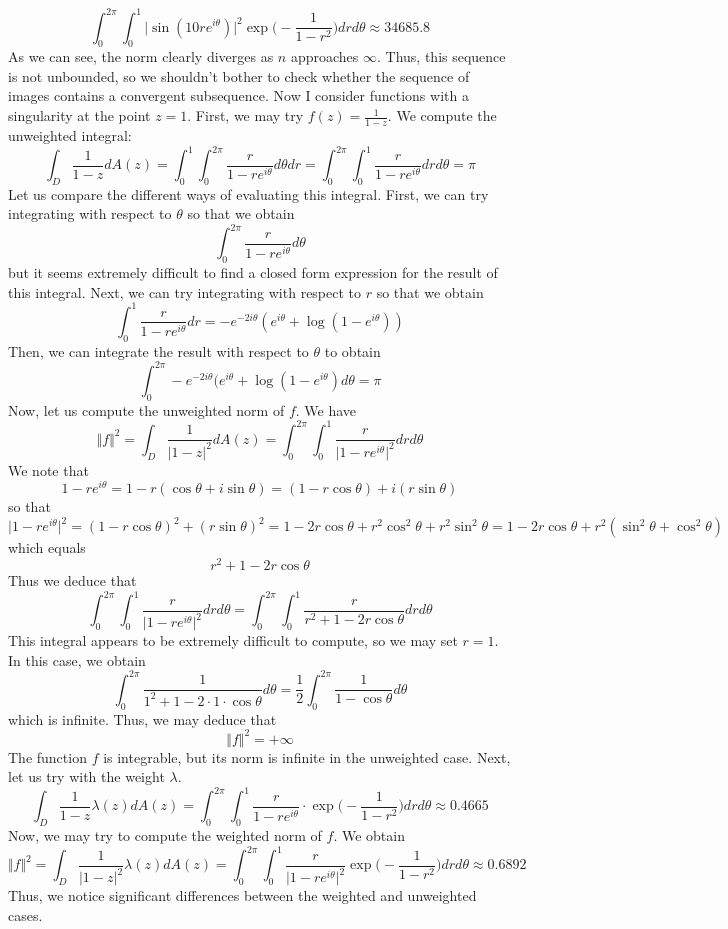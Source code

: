 \documentclass[12pt]{article}
\begin{document}
\[
\int_0^{2\pi} \int_0^1 \vert \sin(10re^{i\theta}) \vert^2 \exp\bigg(-\frac{1}{1-r^2}\bigg) dr d\theta \approx 34685.8
\] As we can see, the norm clearly diverges as $n$ approaches $\infty$. Thus, this sequence is not unbounded, so we shouldn't bother to check whether the sequence of images contains a convergent subsequence. Now I consider functions with a singularity at the point $z = 1$. First, we may try $f(z) = \frac{1}{1-z}$. We compute the unweighted integral:
\[
\int_D \frac{1}{1-z} dA(z) = \int_0^1 \int_0^{2\pi} \frac{r}{1-re^{i\theta}} d\theta dr = \int_0^{2\pi} \int_0^1 \frac{r}{1-re^{i\theta}} dr d\theta = \pi
\] Let us compare the different ways of evaluating this integral. First, we can try integrating with respect to $\theta$ so that we obtain
\[
\int_0^{2\pi} \frac{r}{1-re^{i\theta}} d\theta
\] but it seems extremely difficult to find a closed form expression for the result of this integral. Next, we can try integrating with respect to $r$ so that we obtain
\[
\int_0^1 \frac{r}{1-re^{i\theta}} dr = -e^{-2i \theta}(e^{i\theta} + \log(1 - e^{i\theta}))
\] Then, we can integrate the result with respect to $\theta$ to obtain
\[
\int_0^{2\pi} -e^{-2i \theta}(e^{i\theta} + \log(1 - e^{i\theta}) d \theta = \pi
\] Now, let us compute the unweighted norm of $f$. We have
\[
\Vert f \Vert^2 = \int_D \frac{1}{\vert 1- z \vert^2} dA(z) = \int_0^{2\pi} \int_0^1 \frac{r}{\vert 1 - re^{i\theta} \vert^2} dr d \theta 
\] We note that
\[
1 - re^{i\theta} = 1 - r(\cos \theta + i \sin \theta) = (1-r \cos \theta) + i(r \sin \theta)
\] so that
\[
\vert 1 - re^{i\theta} \vert^2 = (1-r\cos \theta)^2 + (r\sin \theta)^2 = 1 - 2r \cos \theta + r^2 \cos^2 \theta + r^2 \sin^2 \theta = 1 - 2r\cos \theta + r^2(\sin^2 \theta + \cos^2 \theta)
\] which equals
\[
r^2 + 1 - 2r \cos \theta
\] Thus we deduce that
\[
\int_0^{2\pi} \int_0^1 \frac{r}{\vert 1 - re^{i\theta} \vert^2} dr d \theta = \int_0^{2\pi} \int_0^1 \frac{r}{r^2 +1 - 2r \cos \theta} dr d \theta  
\] This integral appears to be extremely difficult to compute, so we may set $r = 1$. In this case, we obtain
\[
\int_0^{2\pi} \frac{1}{1^2 +1 - 2 \cdot 1 \cdot \cos \theta} d \theta = \frac{1}{2} \int_0^{2\pi} \frac{1}{1 - \cos \theta} d\theta
\] which is infinite. Thus, we may deduce that
\[
\Vert f \Vert^2 = +\infty
\]
The function $f$ is integrable, but its norm is infinite in the unweighted case. Next, let us try with the weight $\lambda$.
\[
\int_D \frac{1}{1-z} \lambda(z) dA(z) = \int_0^{2\pi} \int_0^1 \frac{r}{1-re^{i\theta}}\cdot \exp\bigg(-\frac{1}{1-r^2}\bigg) dr d\theta \approx 0.4665
\] Now, we may try to compute the weighted norm of $f$. We obtain
\[
\Vert f \Vert ^2 = \int_D \frac{1}{\vert 1-z \vert^2} \lambda(z) dA(z) = \int_0^{2\pi} \int_0^1 \frac{r}{\vert 1 - re^{i\theta} \vert^2} \exp\bigg(-\frac{1}{1-r^2}\bigg) dr d\theta \approx 0.6892
\] Thus, we notice significant differences between the weighted and unweighted cases.
\end{document}
